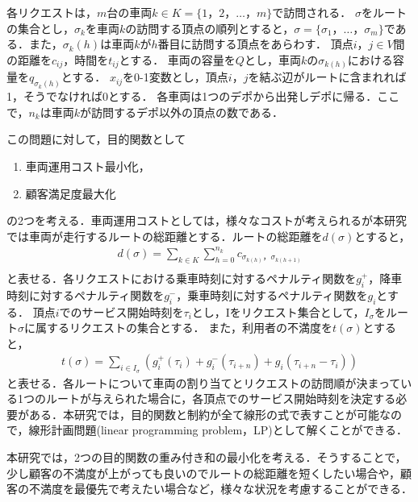 \documentclass[a4j,11pt,twocolumn]{jsarticle}
\begin{document}
各リクエストは，$m$台の車両$k \in K = \{1，2，\ldots，m\}$で訪問される．
$\sigma$をルートの集合とし，$\sigma_k$を車両$k$の訪問する頂点の順列とすると，$\sigma = \{\sigma_1，\ldots，\sigma_m\}$である．また，$\sigma_k(h)$は車両$k$が$h$番目に訪問する頂点をあらわす．
頂点$i，j \in V$間の距離を$c_{ij}$，時間を$t_{ij}$とする．
車両の容量を$Q$とし，車両$k$の$\sigma _{k(h)}$における容量を$q_{\sigma_k(h)}$とする．
$x_{ij}$を0-1変数とし，頂点$i，j$を結ぶ辺がルートに含まれれば1，そうでなければ0とする．
各車両は1つのデポから出発しデポに帰る．ここで，$n_k$は車両$k$が訪問するデポ以外の頂点の数である．

この問題に対して，目的関数として
\begin{enumerate}
 \item 車両運用コスト最小化，
 \item 顧客満足度最大化
\end{enumerate}
の2つを考える．車両運用コストとしては，様々なコストが考えられるが本研究では車両が走行するルートの総距離とする．ルートの総距離を$d(\sigma)$とすると，
\begin{align*}
d(\sigma) = \sum_ {k\in K} \sum_{h=0}^{n_k} c_ {\sigma_{k(h)}，\sigma_ {k(h+1)} }\\
\end{align*}
と表せる．各リクエストにおける乗車時刻に対するペナルティ関数を$g^+_i$，降車時刻に対するペナルティ関数を$g^-_i$，乗車時刻に対するペナルティ関数を$g_i$とする．
頂点$i$でのサービス開始時刻を$\tau_i$とし，Iをリクエスト集合として，$I_\sigma$をルート$\sigma$に属するリクエストの集合とする．
また，利用者の不満度を$t(\sigma)$とすると，
\begin{align*}
t(\sigma) = \sum_ {i \in I_\sigma} (g^+_i(\tau_i)+g^-_i(\tau_{i+n})+g_i(\tau_{i+n}-\tau_i))
\end{align*}
と表せる．各ルートについて車両の割り当てとリクエストの訪問順が決まっている1つのルートが与えられた場合に，各頂点でのサービス開始時刻を決定する必要がある．本研究では，目的関数と制約が全て線形の式で表すことが可能なので，線形計画問題(linear programming problem，LP)として解くことができる．

本研究では，2つの目的関数の重み付き和の最小化を考える．そうすることで，少し顧客の不満度が上がっても良いのでルートの総距離を短くしたい場合や，顧客の不満度を最優先で考えたい場合など，様々な状況を考慮することができる．
\end{document}
